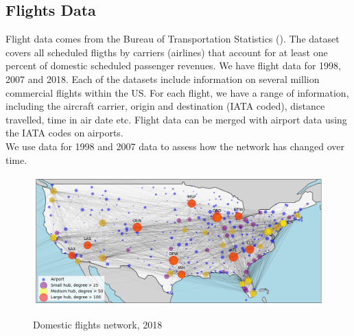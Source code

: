 
\subsection{Flights Data}
\label{subsec:Flight_Data}
Flight data comes from the Bureau of Transportation Statistics (\citet{BTS}). The dataset covers all scheduled fligths by carriers (airlines) that account for at least one percent of domestic scheduled passenger revenues. We have flight data for 1998, 2007 and 2018. Each of the datasets include information on several million commercial flights within the US. For each flight, we have a range of information, including the aircraft carrier, origin and destination (IATA coded), distance travelled, time in air date etc. Flight data can be merged with airport data using the IATA codes on airports. \medskip\\
We use data for 1998 and 2007 data to assess how the network has changed over time.
\begin{figure}[H]
  \centering
  \caption{Domestic flights network, 2018}
    \includegraphics[width=1. \textwidth]{Exam/Figures/map_general_18}
    \vspace{-0.7cm}
  \label{fig:map_general_18}
\end{figure}


